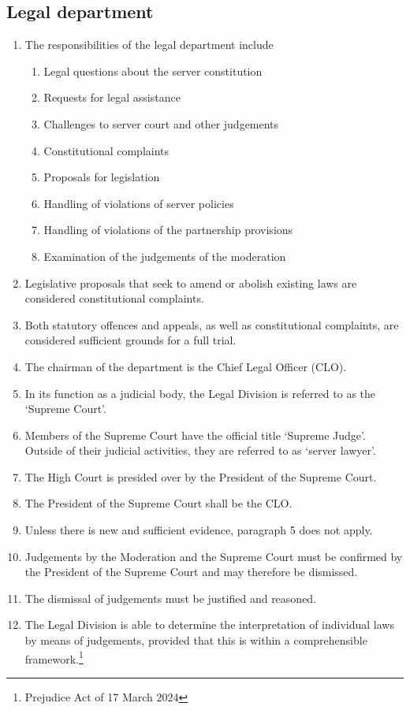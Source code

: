 \documentclass{article}
\begin{document}
\subsection{Legal department}
\begin{enumerate}[(1)]
	\item The responsibilities of the legal department include
	\begin{enumerate}[1.]
		\item Legal questions about the server constitution
		\item Requests for legal assistance
		\item Challenges to server court and other judgements
		\item Constitutional complaints
		\item Proposals for legislation
		\item Handling of violations of server policies
		\item Handling of violations of the partnership provisions
		\item Examination of the judgements of the moderation
	\end{enumerate}
	\item Legislative proposals that seek to amend or abolish existing laws are considered constitutional complaints.
	\item Both statutory offences and appeals, as well as constitutional complaints, are considered sufficient grounds for a full trial.
	\item The chairman of the department is the Chief Legal Officer (CLO).
	\item In its function as a judicial body, the Legal Division is referred to as the `Supreme Court'.
	\item Members of the Supreme Court have the official title `Supreme Judge'. Outside of their judicial activities, they are referred to as `server lawyer'.
	\item The High Court is presided over by the President of the Supreme Court.
	\item The President of the Supreme Court shall be the CLO.\@
	\item Unless there is new and sufficient evidence, paragraph 5 does not apply.
	\item Judgements by the Moderation and the Supreme Court must be confirmed by the President of the Supreme Court and may therefore be dismissed.
	\item The dismissal of judgements must be justified and reasoned.
	\item The Legal Division is able to determine the interpretation of individual laws by means of judgements, provided that this is within a comprehensible framework.\footnote{Prejudice Act of 17 March 2024}
\end{enumerate}
\end{document}
